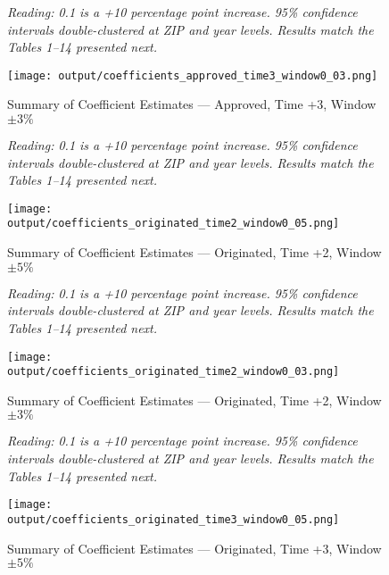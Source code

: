 \documentclass{article}
\begin{document}
\clearpage
\pagebreak
\begin{figure}
    
    \caption{Summary of Coefficient Estimates --- Approved, Time +3, Window $\pm 3\%$}
    \emph{Reading: 0.1 is a +10 percentage point increase. 95\% confidence intervals double-clustered at ZIP and year levels. Results match the Tables 1--14 presented next.}

    \begin{center}
        \texttt{[image: output/coefficients\_approved\_time3\_window0\_03.png]}
    \end{center}
    
\end{figure}
    
\clearpage
\pagebreak

\begin{figure}
    
    \caption{Summary of Coefficient Estimates --- Originated, Time +2, Window $\pm 5\%$}

    \emph{Reading: 0.1 is a +10 percentage point increase. 95\% confidence intervals double-clustered at ZIP and year levels. Results match the Tables 1--14 presented next.}

    \begin{center}
        \texttt{[image: output/coefficients\_originated\_time2\_window0\_05.png]}
    \end{center}
    
\end{figure}
    
\clearpage
\pagebreak

\begin{figure}
    
    \caption{Summary of Coefficient Estimates --- Originated, Time +2, Window $\pm 3\%$}

    \emph{Reading: 0.1 is a +10 percentage point increase. 95\% confidence intervals double-clustered at ZIP and year levels. Results match the Tables 1--14 presented next.}

    \begin{center}
        \texttt{[image: output/coefficients\_originated\_time2\_window0\_03.png]}
    \end{center}
    
\end{figure}
    
\clearpage
\pagebreak

\begin{figure}
    
    \caption{Summary of Coefficient Estimates --- Originated, Time +3, Window $\pm 5\%$}

    \emph{Reading: 0.1 is a +10 percentage point increase. 95\% confidence intervals double-clustered at ZIP and year levels. Results match the Tables 1--14 presented next.}

    \begin{center}
        \texttt{[image: output/coefficients\_originated\_time3\_window0\_05.png]}
    \end{center}
    
\end{figure}
    
\end{document}
